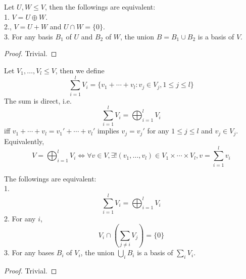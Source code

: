 \begin{lemma}
    Let $U,W\le V$, then the followings are equivalent:\\
    1. $V=U\oplus W$.\\
    2., $V=U+W$ and $U\cap W=\{0\}$.\\
    3. For any basis $B_1$ of $U$ and $B_2$ of $W$, the union $B=B_1\cup B_2$ is a basis of $V$.
\end{lemma}
\begin{proof}
    Trivial.
\end{proof}
\begin{definition}
    Let $V_1,\ldots,V_l\le V$, then we define
    $$\sum_{i=1}^lV_i=\{v_1+\cdots+v_l:v_j\in V_j,1\le j\le l\}$$
    The sum is direct, i.e.
    $$\sum_{i=1}^lV_i=\bigoplus_{i=1}^lV_i$$
    iff $v_1+\cdots +v_l=v_1'+\cdots +v_l'$ implies $v_j=v_j'$ for any $1\le j\le l$ and $v_j\in V_j$.
    Equivalently,
    $$V=\bigoplus_{i=1}^lV_i\iff \forall v\in V,\exists!(v_1,\ldots,v_l)\in V_1\times\cdots\times V_l,v=\sum_{i=1}^lv_i$$
\end{definition}
\begin{proposition}
    The followings are equivalent:\\
    1.
    $$\sum_{i=1}^lV_i=\bigoplus_{i=1}^lV_i$$
    2. For any $i$,
    $$V_i\cap\left( \sum_{j\neq i}V_j \right)=\{0\}$$
    3. For any bases $B_i$ of $V_i$, the union $\bigcup_iB_i$ is a basis of $\sum_iV_i$.
\end{proposition}
\begin{proof}
    Trivial.
\end{proof}